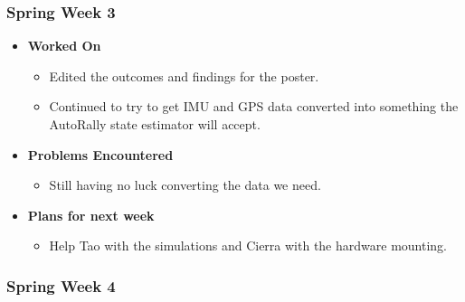 \documentclass[compsoc,draftclsnofoot,onecolumn,10pt]{IEEEtran}
\begin{document}
\subsubsection{Spring Week 3}
\begin{itemize}
    \item {\textbf{Worked On}}
    \begin{itemize}
        \item Edited the outcomes and findings for the poster.
        \item Continued to try to get IMU and GPS data converted into something the AutoRally state estimator will accept.
    \end{itemize}

    \item {\textbf{Problems Encountered}}
    \begin{itemize}
        \item Still having no luck converting the data we need.
    \end{itemize}

    \item{\textbf{Plans for next week}}
    \begin{itemize}
        \item Help Tao with the simulations and Cierra with the hardware mounting.
    \end{itemize}
\end{itemize}

\subsubsection{Spring Week 4}
\end{document}
